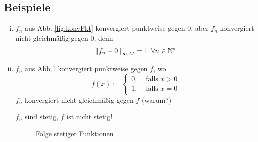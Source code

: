 \subsection[Beispiele von konvergierenden Funktionenfolgen]{Beispiele} %
\label{sub:13}
\begin{enumerate}[(i)]
	\item 
	$f_n$ aus Abb. \ref{fig:konvFkt} konvergiert punktweise gegen 0, aber $f_n$ konvergiert nicht gleichmäßig gegen 0, denn 
	\[
		\norm[\infty, M]{f_n -0} = 1 \enspace \forall n \in \mathds{N}^* 
	\]
	\begin{figure}[ht]
	\end{figure}
	
	\item 
	$f_n$ aus Abb.\ref{fig:stetkonvFkt} konvergiert punktweise gegen $f$, wo 
	\[
		f(x) := \begin{cases}
			0, &\text{ falls }x>0\\
			1, &\text{ falls }x=0
		\end{cases}
	\]
	$f_n$ konvergiert nicht gleichmäßig gegen $f$ \hfill (warum?)
	
	$f_n$ sind stetig, $f$ ist nicht stetig!
	\begin{figure}[ht]
		\caption{Folge stetiger Funktionen}
		\label{fig:stetkonvFkt}
	\end{figure}
	

\end{enumerate}
